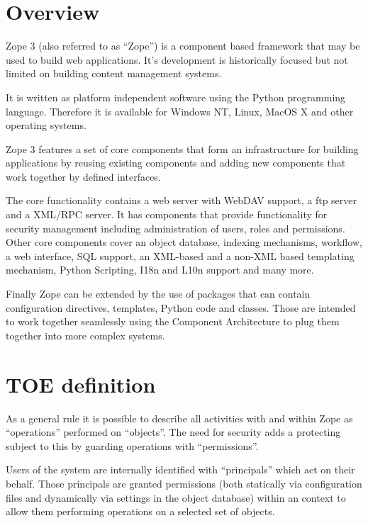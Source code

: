 \documentclass[12pt,english]{scrbook}
\begin{document}



\section{Overview}

Zope 3 (also referred to as ``Zope'') is a component based framework that may be
used to build web applications. It's development is historically focused but
not limited on building content management systems.

It is written as platform independent software using the Python programming
language. Therefore it is available for Windows NT, Linux, MacOS X and other
operating systems.

Zope 3 features a set of core components that form an infrastructure for 
building applications by reusing existing components and adding new components
that work together by defined interfaces.

The core functionality contains a web server with WebDAV support, a ftp server
and a XML/RPC server.  It has components that provide functionality for
security management including administration of users, roles and permissions.
Other core components cover an object database, indexing mechanisms,
workflow, a web interface, SQL support, an XML-based and a non-XML based templating
mechanism, Python Scripting, I18n and L10n support and many more.

Finally Zope can be extended by the use of packages that can contain
configuration directives, templates, Python code and classes. Those are
intended to work together seamlessly using the Component Architecture to plug
them together into more complex systems.





\section{TOE definition}

As a general rule it is possible to describe all activities with and within Zope as
``operations'' performed on ``objects''. The need for security adds a protecting
subject to this by guarding operations with ``permissions''.

Users of the system are internally identified with ``principals'' which act on
their behalf.  Those principals are granted permissions (both statically via
configuration files and dynamically via settings in the object database) within
an context to allow them performing operations on a selected set of objects.
\end{document}
